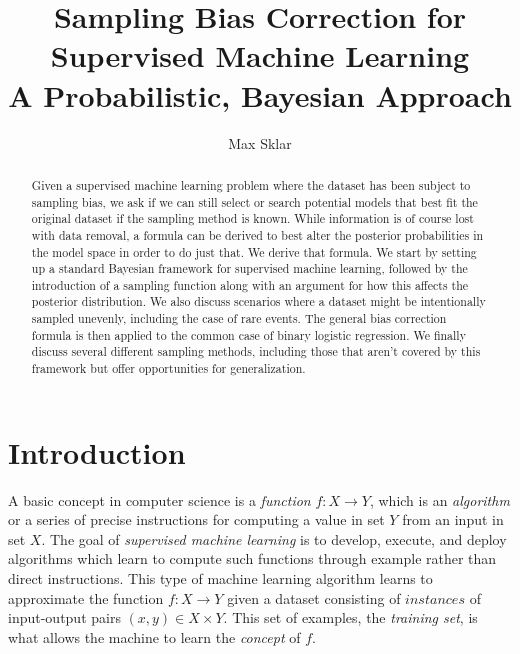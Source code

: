 \documentclass[twoside]{article}
\begin{document}
\parindent=0in
\parskip=12pt

\title{
  Sampling Bias Correction for Supervised Machine Learning \\
  \large{
    A  Probabilistic, Bayesian Approach
  }
}

\author{Max Sklar}

\maketitle
\thispagestyle{empty}

\begin{abstract}
Given a supervised machine learning problem where the dataset has been subject to sampling bias, we ask if we can still select or search potential models that best fit the original dataset if the sampling method is known. While information is of course lost with data removal, a formula can be derived to best alter the posterior probabilities in the model space in order to do just that. We derive that formula. We start by setting up a standard Bayesian framework for supervised machine learning, followed by the introduction of a sampling function along with an argument for how this affects the posterior distribution. We also discuss scenarios where a dataset might be intentionally sampled unevenly, including the case of rare events. The general bias correction formula is then applied to the common case of binary logistic regression. We finally discuss several different sampling methods, including those that aren’t covered by this framework but offer opportunities for generalization.
\end{abstract}

\section{Introduction}
\label{section:introduction}

A basic concept in computer science is a \textit{function} \(f: X \to Y\), which is an \textit{algorithm} or a series of precise instructions for computing a value in set \(Y\) from an input in set \(X\). The goal of \textit{supervised machine learning} is to develop, execute, and deploy algorithms which learn to compute such functions through example rather than direct instructions. This type of machine learning algorithm learns to approximate the function \(f: X \to Y\) given a dataset consisting of \(instances\) of input-output pairs \((x, y) \in X \times Y\). This set of examples, the \textit{training set}, is what allows the machine to learn the \textit{concept} of \(f\).
\end{document}
